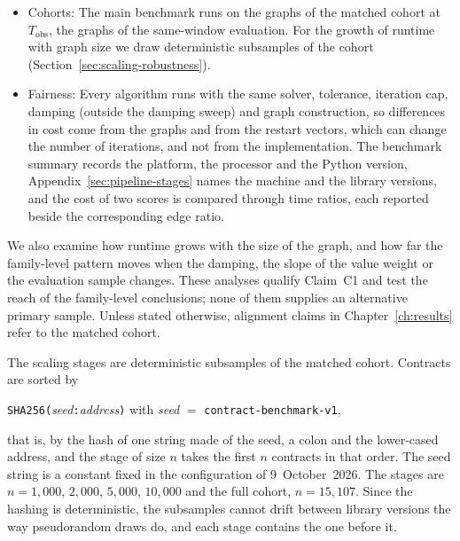 \begin{itemize}
\item Cohorts: The main benchmark runs on the graphs of the matched cohort at $T_{\mathrm{obs}}$, the graphs of the same-window evaluation. For the growth of runtime with graph size we draw deterministic subsamples of the cohort (Section~\ref{sec:scaling-robustness}).

\item Fairness: Every algorithm runs with the same solver, tolerance, iteration cap, damping (outside the damping sweep) and graph construction, so differences in cost come from the graphs and from the restart vectors, which can change the number of iterations, and not from the implementation. The benchmark summary records the platform, the processor and the Python version, Appendix~\ref{sec:pipeline-stages} names the machine and the library versions, and the cost of two scores is compared through time ratios, each reported beside the corresponding edge ratio.

\end{itemize}


We also examine how runtime grows with the size of the graph, and how far the family-level pattern moves when the damping, the slope of the value weight or the evaluation sample changes. These analyses qualify Claim~C1 and test the reach of the family-level conclusions; none of them supplies an alternative primary sample. Unless stated otherwise, alignment claims in Chapter~\ref{ch:results} refer to the matched cohort.


The scaling stages are deterministic subsamples of the matched cohort. Contracts are sorted by
\begin{center}
\texttt{SHA256(}\textit{seed}\texttt{:}\textit{address}\texttt{)} with \textit{seed} $=$ \texttt{contract-benchmark-v1},
\end{center}
that is, by the hash of one string made of the seed, a colon and the lower-cased address, and the stage of size $n$ takes the first $n$ contracts in that order. The seed string is a constant fixed in the configuration of 9~October~2026. The stages are $n=1{,}000$, $2{,}000$, $5{,}000$, $10{,}000$ and the full cohort, $n=15{,}107$. Since the hashing is deterministic, the subsamples cannot drift between library versions the way pseudorandom draws do, and each stage contains the one before it.


